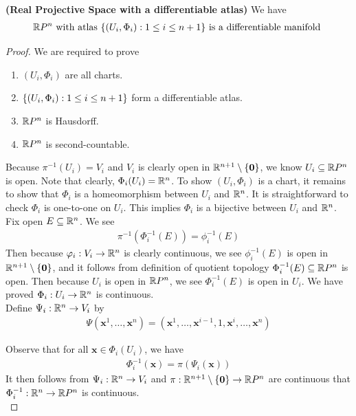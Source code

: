 \documentclass{report}
\begin{document}
\begin{theorem}
\textbf{(Real Projective Space with a differentiable atlas)} We have
\begin{align*}
  \mathbb{R} P^n\text{ with atlas }\{ (U_i,\Phi_i):1\leq i\leq n+1 \}\text{ is a differentiable manifold }
\end{align*}
\end{theorem}
\begin{proof}
We are required to prove 
\begin{enumerate}[label=(\alph*)] 
  \item $(U_i,\Phi_i)$ are all charts. 
  \item $\{ (U_i,\Phi_i):1\leq i\leq n+1 \}$ form a differentiable atlas. 
\item $\mathbb{R} P^n$ is Hausdorff.
\item $\mathbb{R} P^n$ is second-countable. 
\end{enumerate}
 Because $\pi^{-1}(U_i)=V_i$ and $V_i$ is clearly open in $\mathbb{R}^{n+1}\setminus \{ \textbf{0} \}$, we know $U_i\subseteq \mathbb{R} P^n$ is open. Note that clearly,   $\Phi_i(U_i)=\mathbb{R}^n$. To show $(U_i,\Phi_i)$ is a chart, it remains to show that $\Phi_i$ is a homeomorphism between $U_i$ and  $\mathbb{R}^n$.  It is straightforward to check $\Phi_i$ is one-to-one on $U_i$. This implies $\Phi_i$ is a bijective between $U_i$ and  $\mathbb{R}^n$. \\


Fix open $E\subseteq \mathbb{R}^n$. We see 
\begin{align*}
  \pi^{-1}(\Phi_i^{-1}(E))=\phi_i^{-1}(E)
\end{align*}
Then because $\varphi_i:V_i\rightarrow \mathbb{R}^n$ is clearly continuous, we see $\phi_i^{-1}(E)$ is open in $\mathbb{R}^{n+1}\setminus \{ \textbf{0} \}$, and it follows from definition of quotient topology  $\Phi_i^{-1}(E)\subseteq \mathbb{R} P^n$ is open. Then because $U_i$ is open in  $\mathbb{R} P^n$, we see $\Phi_i^{-1}(E)$ is open in $U_i$. We have proved  $\Phi_i:U_i\rightarrow \mathbb{R}^n$ is continuous.\\


Define $\Psi_i: \mathbb{R}^n\rightarrow V_i$ by 
\begin{align*}
\Psi (\textbf{x}^1,\dots ,\textbf{x}^n)= (\textbf{x}^1,\dots ,\textbf{x}^{i-1},1,\textbf{x}^i,\dots ,\textbf{x}^n)
\end{align*}



Observe that for all $\textbf{x}\in \Phi_i(U_i)$, we have
\begin{align*}
\Phi_i^{-1}(\textbf{x})= \pi(\Psi_i (\textbf{x}))
\end{align*}
It then follows from $\Psi_i:\mathbb{R}^n\rightarrow V_i$ and $\pi:\mathbb{R}^{n+1}\setminus \{ \textbf{0} \}\rightarrow \mathbb{R} P^n$ are continuous that $\Phi_i^{-1}:\mathbb{R}^n\rightarrow \mathbb{R} P^n$ is continuous.\\


\end{proof}
\end{document}

